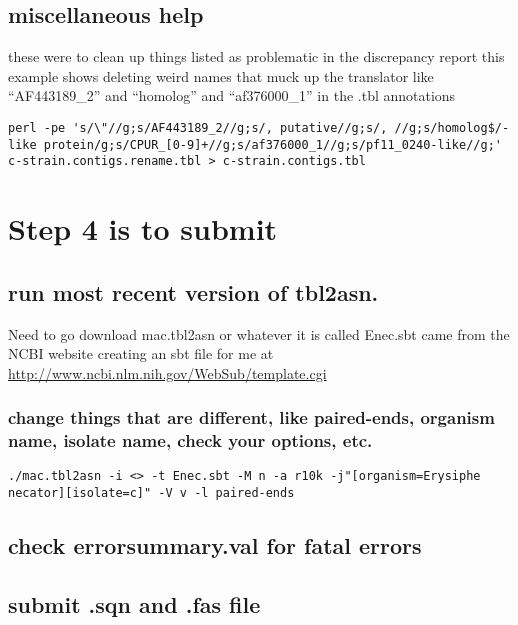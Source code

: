 \documentclass[11pt]{article}
\begin{document}
\subsection*{miscellaneous help}
\label{sec-3.6}

these were to clean up things listed as problematic in the discrepancy report
this example shows deleting weird names that muck up the translator like ``AF443189\_{}2'' and ``homolog'' and ``af376000\_{}1''
in the .tbl annotations


\begin{verbatim}
perl -pe 's/\"//g;s/AF443189_2//g;s/, putative//g;s/, //g;s/homolog$/-like protein/g;s/CPUR_[0-9]+//g;s/af376000_1//g;s/pf11_0240-like//g;' c-strain.contigs.rename.tbl > c-strain.contigs.tbl
\end{verbatim}



\section*{Step 4 is to submit}
\label{sec-4}

\subsection*{run most recent version of tbl2asn.}
\label{sec-4.1}

Need to go download mac.tbl2asn or whatever it is called
Enec.sbt came from the NCBI website creating an sbt file for me at
\href{http://www.ncbi.nlm.nih.gov/WebSub/template.cgi}{http://www.ncbi.nlm.nih.gov/WebSub/template.cgi}
\subsubsection*{change things that are different, like paired-ends, organism name, isolate name, check your options, etc.}
\label{sec-4.1.1}


\begin{verbatim}
./mac.tbl2asn -i <> -t Enec.sbt -M n -a r10k -j"[organism=Erysiphe necator][isolate=c]" -V v -l paired-ends
\end{verbatim}



\subsection*{check errorsummary.val for fatal errors}
\label{sec-4.2}

\subsection*{submit .sqn and .fas file}
\label{sec-4.3}
\end{document}
